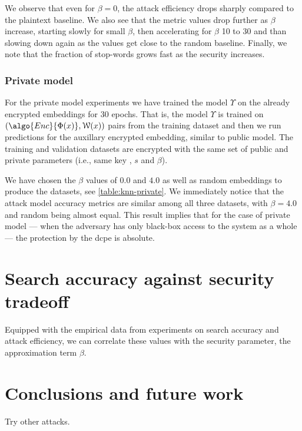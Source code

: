 				We observe that even for $\beta = 0$, the attack efficiency drops sharply compared to the plaintext baseline.
				We also see that the metric values drop further as $\beta$ increase, starting slowly for small $\beta$, then accelerating for $\beta$ 10 to 30 and than slowing down again as the values get close to the random baseline.
				Finally, we note that the fraction of stop-words grows fast as the security increases.

			\subsubsection{Private model}

				For the private model experiments we have trained the model $\Upsilon$ on the already encrypted embeddings for 30 epochs.
				That is, the model $\Upsilon$ is trained on $ ( \algo{Enc}{ \Phi(x) }, \mathcal{W}(x) ) $ pairs from the training dataset and then we run predictions for the auxillary encrypted embedding, similar to public model.
				The training and validation datasets are encrypted with the same set of public and private parameters (i.e., same key \key{}, $s$ and $\beta$).

				

				We have chosen the $\beta$ values of $0.0$ and $4.0$ as well as random embeddings to produce the datasets, see \cref{table:knn-private}.
				We immediately notice that the attack model accuracy metrics are similar among all three datasets, with $\beta = 4.0$ and random being almost equal.
				This result implies that for the case of private model --- when the adversary has only black-box access to the system as a whole --- the protection by the \acrshort{dcpe} is absolute.

	\section{Search accuracy against security tradeoff}

		Equipped with the empirical data from experiments on search accuracy and attack efficiency, we can correlate these values with the security parameter, the approximation term $\beta$.

		


	\section{Conclusions and future work}

		Try other attacks.





